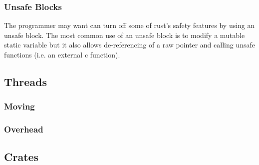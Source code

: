 \subsubsection{Unsafe Blocks}
The programmer may want can turn off some of rust's safety features by using an unsafe block. The most common use of an unsafe block is to modify a mutable static variable but it also allows de-referencing of a raw pointer and calling unsafe functions (i.e. an external c function).

\subsection{Threads}
\subsubsection{Moving}
\subsubsection{Overhead}

\subsection{Crates}
